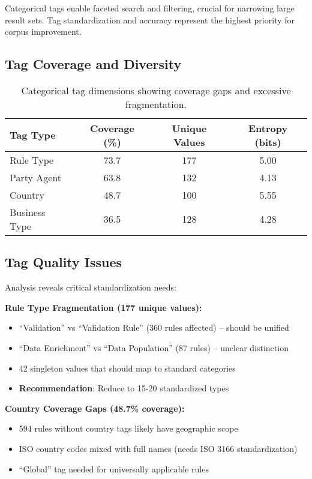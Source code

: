 Categorical tags enable faceted search and filtering, crucial for narrowing large result sets. Tag standardization and accuracy represent the highest priority for corpus improvement.

\subsection{Tag Coverage and Diversity}

\begin{table}[ht]
\centering
\begin{tabular}{lccc}
\toprule
\textbf{Tag Type} & \textbf{Coverage (\%)} & \textbf{Unique Values} & \textbf{Entropy (bits)} \\
\midrule
Rule Type & 73.7 & 177 & 5.00 \\
Party Agent & 63.8 & 132 & 4.13 \\
Country & 48.7 & 100 & 5.55 \\
Business Type & 36.5 & 128 & 4.28 \\
\bottomrule
\end{tabular}
\caption{Categorical tag dimensions showing coverage gaps and excessive fragmentation.}
\label{tab:tag-coverage}
\end{table}

\subsection{Tag Quality Issues}

Analysis reveals critical standardization needs:

\textbf{Rule Type Fragmentation (177 unique values):}
\begin{itemize}[leftmargin=*,itemsep=2pt,topsep=2pt]
 \item ``Validation'' vs ``Validation Rule'' (360 rules affected) -- should be unified
 \item ``Data Enrichment'' vs ``Data Population'' (87 rules) -- unclear distinction
 \item 42 singleton values that should map to standard categories
 \item \textbf{Recommendation}: Reduce to 15-20 standardized types
\end{itemize}

\textbf{Country Coverage Gaps (48.7\% coverage):}
\begin{itemize}[leftmargin=*,itemsep=2pt,topsep=2pt]
 \item 594 rules without country tags likely have geographic scope
 \item ISO country codes mixed with full names (needs ISO 3166 standardization)
 \item ``Global'' tag needed for universally applicable rules
\end{itemize}

